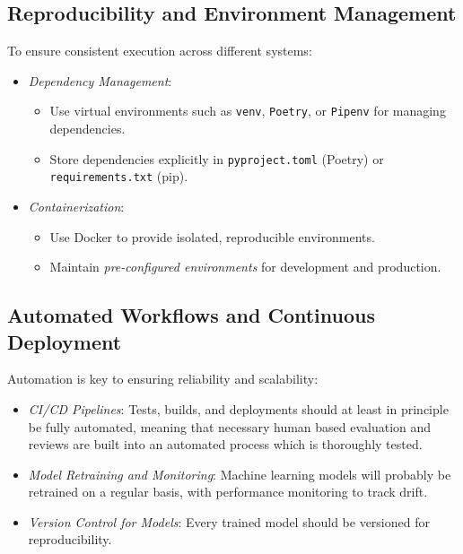\subsection{Reproducibility and Environment Management}
To ensure consistent execution across different systems:

\begin{itemize}[itemsep=1pt,topsep=3pt]
    \item \emph{Dependency Management}:
    \begin{itemize}[itemsep=1pt,topsep=3pt]
        \item Use virtual environments such as \texttt{venv}, \texttt{Poetry}, or \texttt{Pipenv} for managing dependencies.
        \item Store dependencies explicitly in \texttt{pyproject.toml} (Poetry) or \texttt{requirements.txt} (pip).
    \end{itemize}
    \item \emph{Containerization}:
    \begin{itemize}
        \item Use Docker to provide isolated, reproducible environments.
        \item Maintain \emph{pre-configured environments} for development and production.
    \end{itemize}
\end{itemize}

\subsection{Automated Workflows and Continuous Deployment}
Automation is key to ensuring reliability and scalability:

\begin{itemize}[itemsep=1pt,topsep=3pt]
    \item \emph{CI/CD Pipelines}: Tests, builds, and deployments should at least in principle be fully automated, meaning that necessary human based evaluation and reviews are built into an automated process which is thoroughly tested. 
    \item \emph{Model Retraining and Monitoring}: Machine learning models will probably be retrained on a regular basis, with performance monitoring to track drift.
    \item \emph{Version Control for Models}: Every trained model should be versioned for reproducibility.
\end{itemize}

